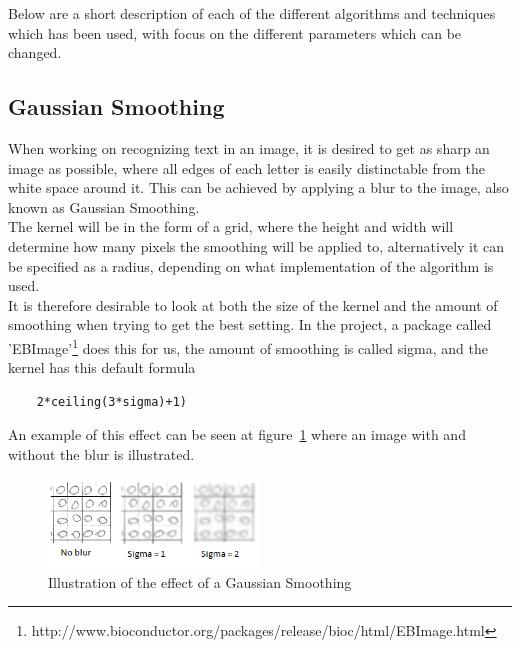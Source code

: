 \documentclass[report]{subfiles}
\begin{document}
Below are a short description of each of the different algorithms and techniques which has been used, with focus on the different parameters which can be changed.

\subsection{Gaussian Smoothing}
When working on recognizing text in an image, it is desired to get as sharp an image as possible, where all edges of each letter is easily distinctable from the white space around it. This can be achieved by applying a blur to the image, also known as Gaussian Smoothing.\\ 
The kernel will be in the form of a grid, where the height and width will determine how many pixels the smoothing will be applied to, alternatively it can be specified as a radius, depending on what implementation of the algorithm is used.\\
It is therefore desirable to look at both the size of the kernel and the amount of smoothing when trying to get the best setting. In the project, a package called 'EBImage'\footnote{http://www.bioconductor.org/packages/release/bioc/html/EBImage.html} does this for us, the amount of smoothing is called sigma, and the kernel has this default formula 
\begin{lstlisting}
	2*ceiling(3*sigma)+1)
\end{lstlisting}
An example of this effect can be seen at figure~\ref{fig:imgExplainBlur} where an image with and without the blur is illustrated.

\begin{figure}[H]
	\centering
	\includegraphics[width=0.5\textwidth]{images/imgBlurDesc}
	\caption{Illustration of the effect of a Gaussian Smoothing}
	\label{fig:imgExplainBlur}
\end{figure}
\end{document}
